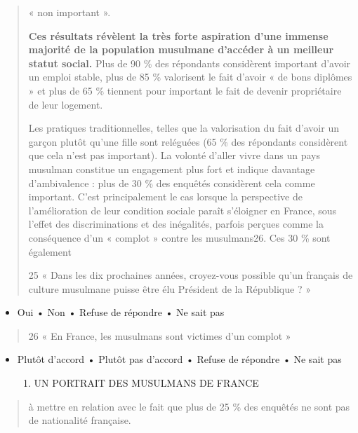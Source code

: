 \begin{quote}
« non important ».

\textbf{Ces résultats révèlent la très forte aspiration d'une immense
majorité de la population musulmane d'accéder à un meilleur statut
social.} Plus de 90 \% des répondants considèrent important d'avoir un
emploi stable, plus de 85 \% valorisent le fait d'avoir « de bons
diplômes » et plus de 65 \% tiennent pour important le fait de devenir
propriétaire de leur logement.

Les pratiques traditionnelles, telles que la valorisation du fait
d'avoir un garçon plutôt qu'une fille sont reléguées (65 \% des
répondants considèrent que cela n'est pas important). La volonté d'aller
vivre dans un pays musulman constitue un engagement plus fort et indique
davantage d'ambivalence : plus de 30 \% des enquêtés considèrent cela
comme important. C'est principalement le cas lorsque la perspective de
l'amélioration de leur condition sociale paraît s'éloigner en France,
sous l'effet des discriminations et des inégalités, parfois perçues
comme la conséquence d'un « complot » contre les musulmans26. Ces 30 \%
sont également

25 « Dans les dix prochaines années, croyez-vous possible qu'un français
de culture musulmane puisse être élu Président de la République ? »
\end{quote}

\begin{itemize}
\item
  Oui • Non • Refuse de répondre • Ne sait pas
\end{itemize}

\begin{quote}
26 « En France, les musulmans sont victimes d'un complot »
\end{quote}

\begin{itemize}
\item
  Plutôt d'accord • Plutôt pas d'accord • Refuse de répondre • Ne sait
  pas

  \begin{enumerate}
  \def\labelenumi{\Roman{enumi}.}
  \item
    UN PORTRAIT DES MUSULMANS DE FRANCE
  \end{enumerate}
\end{itemize}

\begin{quote}
à mettre en relation avec le fait que plus de 25 \% des enquêtés ne sont
pas de nationalité française.
\end{quote}

